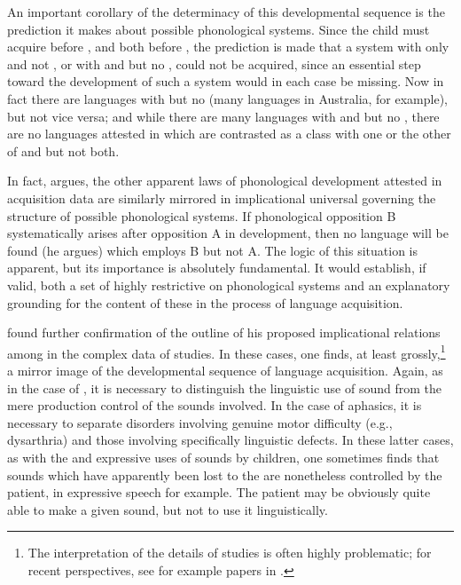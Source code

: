 An important corollary of the determinacy of this developmental
sequence is the prediction it makes about possible phonological
systems. Since the child must acquire  before , and
both before , the prediction is made that a system with only
 and not , or with  and  but no
, could not be acquired, since an essential step toward the
development of such a system would in each case be missing. Now in
fact there are languages with  but no  (many languages
in Australia, for example), but not vice versa; and while there are
many languages with  and  but no , there are
no languages attested in which  are contrasted as a class
with one or the other of  and  but not both.

In fact, {\Jakobson} argues, the other apparent laws of phonological
development attested in acquisition data are similarly mirrored in
implicational universal governing the structure of possible
phonological systems. If phonological opposition B systematically
arises after opposition A in development, then no language will be
found (he argues) which employs B but not A. The logic of this
situation is apparent, but its importance is absolutely
fundamental. It would establish, if valid, both a set of highly
restrictive  on phonological systems and an explanatory
grounding for the content of these  in the process of
language acquisition. 

{\Jakobson} found further confirmation of the outline of his proposed
implicational relations among  in the complex data of
 studies. In these cases, one finds, at least grossly,\footnote{The 
interpretation of the details of  studies is
  often highly problematic; for recent perspectives, see for example
  papers in \citealt{hillis15:aphasia}.} a mirror image of the
developmental sequence of language acquisition. Again, as in the case
of , it is necessary to distinguish the linguistic use of
sound  from the mere production control of the sounds
involved. In the case of aphasics, it is necessary to separate
disorders involving genuine motor difficulty (e.g., dysarthria) and
those involving specifically linguistic defects. In these latter
cases, as with the  and expressive uses of sounds by children,
one sometimes finds that sounds which have apparently been lost to the
 are nonetheless controlled by the patient, in
expressive speech for example. The patient may be obviously quite able
to make a given sound, but not to use it linguistically.

